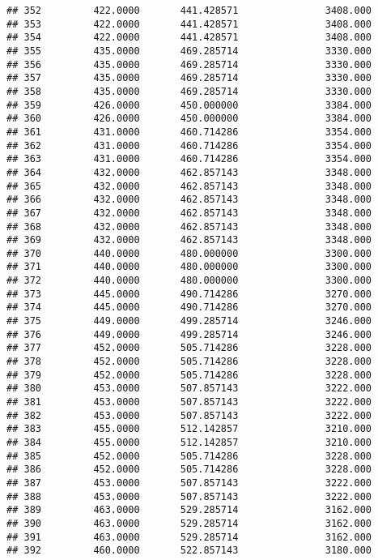 \documentclass[]{article}
\begin{document}
\begin{verbatim}
## 352         422.0000       441.428571               3408.000
## 353         422.0000       441.428571               3408.000
## 354         422.0000       441.428571               3408.000
## 355         435.0000       469.285714               3330.000
## 356         435.0000       469.285714               3330.000
## 357         435.0000       469.285714               3330.000
## 358         435.0000       469.285714               3330.000
## 359         426.0000       450.000000               3384.000
## 360         426.0000       450.000000               3384.000
## 361         431.0000       460.714286               3354.000
## 362         431.0000       460.714286               3354.000
## 363         431.0000       460.714286               3354.000
## 364         432.0000       462.857143               3348.000
## 365         432.0000       462.857143               3348.000
## 366         432.0000       462.857143               3348.000
## 367         432.0000       462.857143               3348.000
## 368         432.0000       462.857143               3348.000
## 369         432.0000       462.857143               3348.000
## 370         440.0000       480.000000               3300.000
## 371         440.0000       480.000000               3300.000
## 372         440.0000       480.000000               3300.000
## 373         445.0000       490.714286               3270.000
## 374         445.0000       490.714286               3270.000
## 375         449.0000       499.285714               3246.000
## 376         449.0000       499.285714               3246.000
## 377         452.0000       505.714286               3228.000
## 378         452.0000       505.714286               3228.000
## 379         452.0000       505.714286               3228.000
## 380         453.0000       507.857143               3222.000
## 381         453.0000       507.857143               3222.000
## 382         453.0000       507.857143               3222.000
## 383         455.0000       512.142857               3210.000
## 384         455.0000       512.142857               3210.000
## 385         452.0000       505.714286               3228.000
## 386         452.0000       505.714286               3228.000
## 387         453.0000       507.857143               3222.000
## 388         453.0000       507.857143               3222.000
## 389         463.0000       529.285714               3162.000
## 390         463.0000       529.285714               3162.000
## 391         463.0000       529.285714               3162.000
## 392         460.0000       522.857143               3180.000

\end{verbatim}
\end{document}
